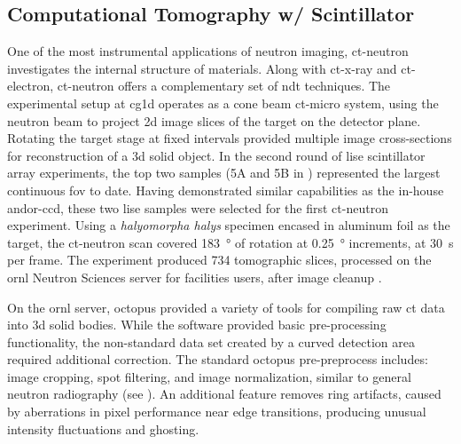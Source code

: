 \documentclass[../../../main.tex]{subfiles}
\begin{document}
%
    \subsection{Computational Tomography w/ Scintillator}%
    \label{sec:chapter-3:imaging-techniques:ct-with-scintillatotr}%
    One of the most instrumental applications of neutron imaging, \gls{ct-neutron} investigates the internal structure of materials.
    Along with \gls{ct-x-ray} and \gls{ct-electron}, \gls{ct-neutron} offers a complementary set of \gls{ndt} techniques.
    The experimental setup at \gls{cg1d} operates as a cone beam \gls{ct-micro} system, using the neutron beam to project \gls{2d} image slices of the target on the detector plane.
    Rotating the target stage at fixed intervals provided multiple image cross-sections for reconstruction of a \gls{3d} solid object.
    In the second round of \gls{lise} scintillator array experiments, the top two samples (5A and 5B in ) represented the largest continuous \gls{fov} to date.
    Having demonstrated similar capabilities as the in-house \gls{andor-ccd}, these two \gls{lise} samples were selected for the first \gls{ct-neutron} experiment.
    Using a \textit{halyomorpha halys} specimen encased in aluminum foil as the target, the \gls{ct-neutron} scan covered \SI{183}{\degree} of rotation at \SI{0.25}{\degree} increments, at \SI{30}{\second} per frame.
    The experiment produced \num{734} tomographic slices, processed on the \gls{ornl} Neutron Sciences server for facilities users, after image cleanup \cite{website:ORNL:Neutron_Sciences}.
    \par%
    On the \gls{ornl} server, \gls{octopus} provided a variety of tools for compiling raw \gls{ct} data into \gls{3d} solid bodies.
    While the software provided basic pre-processing functionality, the non-standard data set created by a curved detection area required additional correction.
    The standard \gls{octopus} pre-preprocess includes: image cropping, spot filtering, and image normalization, similar to general neutron radiography (see ). 
    An additional feature removes ring artifacts, caused by aberrations in pixel performance near edge transitions, producing unusual intensity fluctuations and ghosting.
\end{document}
